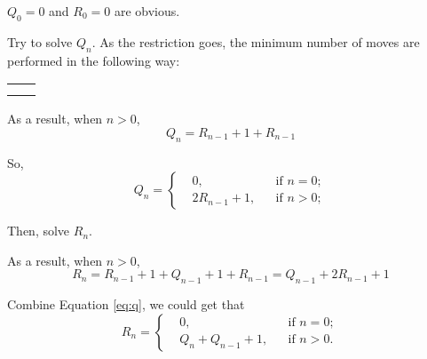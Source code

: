 \documentclass[a4paper,12pt]{article}
\makeatletter
\newtheorem*{solution}{Solution}
\theoremstyle{definition}
\renewenvironment{solution}[1][Solution] {\par\pushQED{\qed}\normalfont\topsep6\p@\@plus6\p@\relax\trivlist\item[\hskip\labelsep\bfseries#1\@addpunct{.}]\ignorespaces}{\popQED\endtrivlist\@endpefalse} \makeatother
\newenvironment{problems}{\begin{list}{}{\renewcommand{\makelabel}[1]{\textbf{##1}\hfil}}}{\end{list}}
\makeatother
\begin{document}
\begin{problems}
\begin{solution}
        $Q_0=0$ and $R_0=0$ are obvious.

        Try to solve $Q_n$. As the restriction goes, the minimum number of moves are performed in the following way:
        
        \begin{center}
            \begin{tabular}{cc}
                 &
                 \\
                 &
                
            \end{tabular}
        \end{center}
        
        As a result, when $n>0$,
        \begin{equation}\label{eq:q}
            Q_n=R_{n-1}+1+R_{n-1}
        \end{equation}

        So,
        \begin{equation*}
            Q_n=\left\{
                \begin{aligned}
                    &0,&& \text{if } n=0;\\
                    &2R_{n-1}+1,&&\text{if } n>0; 
                \end{aligned}
            \right.
        \end{equation*}

        Then, solve $R_n$. 

        
        
        
        
        
        

        As a result, when $n>0$,
        \begin{equation*}
            R_n=R_{n-1}+1+Q_{n-1}+1+R_{n-1}=Q_{n-1}+2R_{n-1}+1
        \end{equation*}

        Combine Equation \eqref{eq:q}, we could get that
        \begin{equation*}
            R_n=\left\{
                \begin{aligned}
                &0,&&\text{if } n=0;\\
                &Q_n+Q_{n-1}+1,&&\text{if } n>0. 
            \end{aligned}
                \right.
        \end{equation*}

    \end{solution}

\end{problems}
\end{document}
